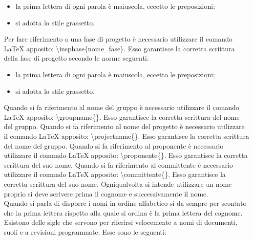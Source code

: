 					\begin{itemize}
						\item la prima lettera di ogni parola è maiuscola, eccetto le preposizioni;
						\item si adotta lo stile grassetto.
					\end{itemize}
					Per fare riferimento a una fase di progetto è necessario utilizzare il comando \LaTeX{} apposito: \textbackslash insphase\{nome\_fase\}. Esso garantisce la corretta scrittura della fase di progetto secondo le norme seguenti:
					\begin{itemize}
						\item la prima lettera di ogni parola è maiuscola, eccetto le preposizioni;
						\item si adotta lo stile grassetto.
					\end{itemize}
					Quando si fa riferimento al nome del gruppo è necessario utilizzare il comando \LaTeX{} apposito: \textbackslash groupname\{\}. Esso garantisce la corretta scrittura del nome del gruppo.
					Quando si fa riferimento al nome del progetto è necessario utilizzare il comando \LaTeX{} apposito: \textbackslash projectname\{\}. Esso garantisce la corretta scrittura del nome del gruppo.
					Quando si fa riferimento al proponente è necessario utilizzare il comando \LaTeX{} apposito: \textbackslash proponente\{\}. Esso garantisce la corretta scrittura del suo nome.
					Quando si fa riferimento al committente è necessario utilizzare il comando \LaTeX{} apposito: \textbackslash committente\{\}. Esso garantisce la corretta scrittura del suo nome.
					Ogniqualvolta si intende utilizzare un nome proprio si deve scrivere prima il cognome e successivamente il nome.\\
					Quando si parla di disporre i nomi in ordine alfabetico si da sempre per scontato che la prima lettera rispetto alla quale si ordina è la prima lettera del cognome.
				\label{sec:sigle}
					Esistono delle sigle che servono per riferirsi velocemente a nomi di documenti, ruoli e a revisioni programmate. Esse sono le seguenti:
